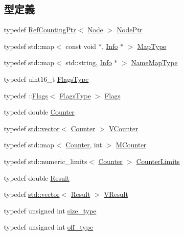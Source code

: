 \subsection*{型定義}
\begin{DoxyCompactItemize}
\item 
typedef \hyperlink{classRefCountingPtr}{RefCountingPtr}$<$ \hyperlink{classStats_1_1Node}{Node} $>$ \hyperlink{namespaceStats_aa88307dbf1a45aa2d5760fbfe45e2000}{NodePtr}
\item 
typedef std::map$<$ const void $\ast$, \hyperlink{classStats_1_1Info}{Info} $\ast$ $>$ \hyperlink{namespaceStats_a2cc2598bf16648653f0799b7dd5b5098}{MapType}
\item 
typedef std::map$<$ std::string, \hyperlink{classStats_1_1Info}{Info} $\ast$ $>$ \hyperlink{namespaceStats_a45a78e2268e9f18065a10879d43f0db4}{NameMapType}
\item 
typedef uint16\_\-t \hyperlink{namespaceStats_ac52f827dcfea58febdc3860fd610dc09}{FlagsType}
\item 
typedef ::\hyperlink{classFlags}{Flags}$<$ \hyperlink{namespaceStats_ac52f827dcfea58febdc3860fd610dc09}{FlagsType} $>$ \hyperlink{namespaceStats_ad6cda6b0b8d7ddfbf8e769082577b482}{Flags}
\item 
typedef double \hyperlink{namespaceStats_ac35128c026c72bb36af9cea00774e8a6}{Counter}
\item 
typedef \hyperlink{classstd_1_1vector}{std::vector}$<$ \hyperlink{namespaceStats_ac35128c026c72bb36af9cea00774e8a6}{Counter} $>$ \hyperlink{namespaceStats_a4f3db77b672fca87108b7ec51b7f22ec}{VCounter}
\item 
typedef std::map$<$ \hyperlink{namespaceStats_ac35128c026c72bb36af9cea00774e8a6}{Counter}, int $>$ \hyperlink{namespaceStats_a5a8433a643d3c7f0692fd273dcbe6423}{MCounter}
\item 
typedef std::numeric\_\-limits$<$ \hyperlink{namespaceStats_ac35128c026c72bb36af9cea00774e8a6}{Counter} $>$ \hyperlink{namespaceStats_a2527a6ff61a21b98505eb75fcda53749}{CounterLimits}
\item 
typedef double \hyperlink{namespaceStats_ad874d2cfd4b4a29ebd480bb2e67f20ae}{Result}
\item 
typedef \hyperlink{classstd_1_1vector}{std::vector}$<$ \hyperlink{namespaceStats_ad874d2cfd4b4a29ebd480bb2e67f20ae}{Result} $>$ \hyperlink{namespaceStats_af863205b7357b2719d9821b5e5c897e1}{VResult}
\item 
typedef unsigned int \hyperlink{namespaceStats_ada51e68d31936547d3729c82daf6b7c6}{size\_\-type}
\item 
typedef unsigned int \hyperlink{namespaceStats_a2773c9fa9e4b0b04a46b37494b44842a}{off\_\-type}
\end{DoxyCompactItemize}
